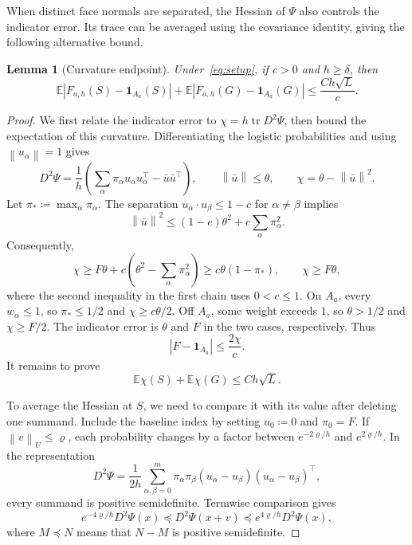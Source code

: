 \documentclass[11pt,letterpaper]{article}
\newtheorem{lemma}{Lemma}
\theoremstyle{remark}
\newcommand{\E}{\mathbb E}
\newcommand{\tr}{\operatorname{tr}}
\newcommand{\norm}[1]{\left\lVert#1\right\rVert}
\newcommand{\ind}{\mathbf 1}
\begin{document}
When distinct face normals are separated, the Hessian of \(\Psi\)
also controls the indicator error. Its trace can be averaged using
the covariance identity, giving the following alternative bound.
\begin{lemma}[Curvature endpoint]\label{appx-lem:endpoint-gap}
Under~\eqref{eq:setup}, if \(c>0\) and \(h\ge\delta\), then
\begin{equation}
 \E|F_{a,h}(S)-\ind_{A_a}(S)|
 +\E|F_{a,h}(G)-\ind_{A_a}(G)|
 \le\frac{Ch\sqrt L}{c}.
 \label{appx-eq:endpoint-gap}
\end{equation}
\end{lemma}

\begin{proof}
We first relate the indicator error to \(\chi=h\tr D^2\Psi\),
then bound the expectation of this curvature. Differentiating the
logistic probabilities and using \(\norm{u_\alpha}=1\) gives
\begin{equation}
 D^2\Psi=\frac1h\left(
 \sum_\alpha\pi_\alpha u_\alpha u_\alpha^\top-\bar u\bar u^\top\right),
 \qquad \norm{\bar u}\le\theta,\qquad
 \chi=\theta-\norm{\bar u}^2.
 \label{appx-eq:hessian}
\end{equation}
Let \(\pi_*\coloneqq\max_\alpha\pi_\alpha\). The separation
\(u_\alpha\cdot u_\beta\le1-c\) for \(\alpha\ne\beta\) implies
\[
 \norm{\bar u}^2
 \le(1-c)\theta^2+c\sum_\alpha\pi_\alpha^2.
\]
Consequently,
\[
 \chi\ge F\theta+c\left(\theta^2-\sum_\alpha\pi_\alpha^2\right)
 \ge c\theta(1-\pi_*),\qquad \chi\ge F\theta,
\]
where the second inequality in the first chain uses \(0<c\le1\).
On \(A_a\), every \(w_\alpha\le1\), so \(\pi_*\le1/2\)
and \(\chi\ge c\theta/2\). Off \(A_a\), some weight exceeds
\(1\), so \(\theta>1/2\) and \(\chi\ge F/2\).
The indicator error is \(\theta\) and \(F\) in the two cases,
respectively. Thus
\begin{equation}
 |F-\ind_{A_a}|\le\frac{2\chi}{c}.
 \label{appx-eq:curvature-error}
\end{equation}
It remains to prove
\begin{equation}
 \E\chi(S)+\E\chi(G)\le Ch\sqrt L.
 \label{appx-eq:gap-contraction}
\end{equation}

To average the Hessian at \(S\), we need to compare it with its value
after deleting one summand. Include the baseline index by setting
\(u_0\coloneqq0\) and \(\pi_0=F\). If \(\norm v_U\le\varrho\), each probability
changes by a factor between \(e^{-2\varrho/h}\) and
\(e^{2\varrho/h}\). In the representation
\[
 D^2\Psi=\frac1{2h}\sum_{\alpha,\beta=0}^m
 \pi_\alpha\pi_\beta
 (u_\alpha-u_\beta)(u_\alpha-u_\beta)^\top,
\]
every summand is positive semidefinite. Termwise comparison gives
\[
 e^{-4\varrho/h}D^2\Psi(x)\preceq D^2\Psi(x+v)
 \preceq e^{4\varrho/h}D^2\Psi(x),
\]
where \(M\preceq N\) means that \(N-M\) is positive semidefinite.


\end{proof}
\end{document}
